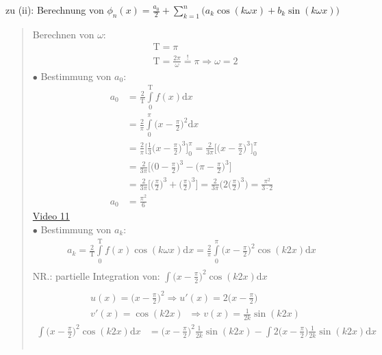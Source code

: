 zu (ii): Berechnung von $ \phi_n(x)=\frac{a_0}{2}+\sum\limits_{k=1}^{n}\big(a_k\cos(k\omega x)+b_k\sin(k\omega x)\big) $\\
\begin{quote}
	Berechnen von $ \omega $:\\
	\begin{align*}
	&\mathrm{T}=\pi\\
	&\mathrm{T}=\frac{2\pi}{\omega}\overset{!}{=}\pi\Rightarrow \omega=2
	\end{align*}
	\newpage
	$\bullet$ \;\; Bestimmung von $a_0$:\\
	\begin{align*}
	a_0&=\frac{2}{\mathrm{T}}\int\limits_{0}^{\mathrm{T}} f(x)\mathrm{d}x\\
	&=\frac{2}{\pi}\int\limits_{0}^{\pi} \bigg(x-\frac{\pi}{2}\bigg)^2\mathrm{d}x\\
	&=\frac{2}{\pi}\Bigg[\frac{1}{3}\bigg(x-\frac{\pi}{2}\bigg)^3\Bigg]^\pi_0=\frac{2}{3\pi}\Bigg[\bigg(x-\frac{\pi}{2}\bigg)^3\Bigg]^\pi_0\\
	&=\frac{2}{3\pi}\Bigg[\bigg(0-\frac{\pi}{2}\bigg)^3-\bigg(\pi-\frac{\pi}{2}\bigg)^3\Bigg]\\
		&=\frac{2}{3\pi}\Bigg[\bigg(\frac{\pi}{2}\bigg)^3+\bigg(\frac{\pi}{2}\bigg)^3\Bigg]=\frac{2}{3\pi}\bigg(2\bigg(\frac{\pi}{2}\bigg)^3\bigg)=\frac{\pi^2}{3\cdot 2}\\
		a_0&=\frac{\pi^2}{6}
	\end{align*}
\href{https://youtu.be/BAyYyKjnVSE}{Video 11}\\
$\bullet$ \;\; Bestimmung von $a_k$:\\
\begin{align*}
a_k=\frac{2}{\mathrm{T}}\int\limits_{0}^{\mathrm{T}} f(x)\cos(k\omega x)\mathrm{d}x=\frac{2}{\pi}\int\limits_{0}^{\pi}\bigg(x-\frac{\pi}{2}\bigg)^2\cos(k2x)\mathrm{d}x \\
\end{align*}
NR.: partielle Integration von: $\int\limits_{}^{}\big(x-\frac{\pi}{2}\big)^2\cos(k2x)\mathrm{d}x  $\\
\begin{align*}
&u(x)=\bigg(x-\frac{\pi}{2}\bigg)^2\Rightarrow u'(x)=2\bigg(x-\frac{\pi}{2}\bigg)\\
&v'(x)=\cos(k2x)\;\;\Rightarrow v(x)=\frac{1}{2k}\sin(k2x)
\end{align*}
\begin{align*}
\int\limits_{}^{}\bigg(x-\frac{\pi}{2}\bigg)^2\cos(k2x)\mathrm{d}x& =\bigg(x-\frac{\pi}{2}\bigg)^2\frac{1}{2k}\sin(k2x)-\int\limits_{}^{} 2\bigg(x-\frac{\pi}{2}\bigg)\frac{1}{2k}\sin(k2x)\mathrm{d}x\\

\end{align*}
\end{quote}
